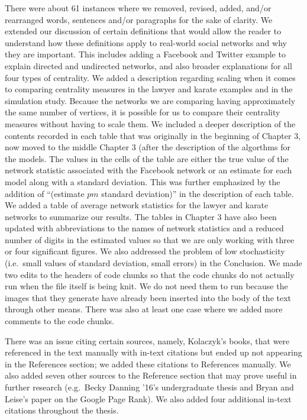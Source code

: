 \documentclass[12pt,twoside]{amherstthesis}
\begin{document}
  There were about 61 instances where we removed, revised, added, and/or
  rearranged words, sentences and/or paragraphs for the sake of clarity.
  We extended our discussion of certain definitions that would allow the
  reader to understand how these definitions apply to real-world social
  networks and why they are important. This includes adding a Facebook and
  Twitter example to explain directed and undirected networks, and also
  broader explanations for all four types of centrality. We added a
  description regarding scaling when it comes to comparing centrality
  measures in the lawyer and karate examples and in the simulation study.
  Because the networks we are comparing having approximately the same
  number of vertices, it is possible for us to compare their centrality
  measures without having to scale them. We included a deeper description
  of the contents recorded in each table that was originally in the
  beginning of Chapter 3, now moved to the middle Chapter 3 (after the
  description of the algorthms for the models. The values in the cells of
  the table are either the true value of the network statistic associated
  with the Facebook network or an estimate for each model along with a
  standard deviation. This was further emphasized by the addition of
  ``(estimate \(pm\) standard deviation)'' in the description of each
  table. We added a table of average network statistics for the lawyer and
  karate networks to summarize our results. The tables in Chapter 3 have
  also been updated with abbreviations to the names of network statistics
  and a reduced number of digits in the estimated values so that we are
  only working with three or four significant figures. We also addressed
  the problem of low stochasticity (i.e.~small values of standard
  deviation, small errors) in the Conclusion. We made two edits to the
  headers of code chunks so that the code chunks do not actually run when
  the file itself is being knit. We do not need them to run because the
  images that they generate have already been inserted into the body of
  the text through other means. There was also at least one case where we
  added more comments to the code chunks.
  
  There was an issue citing certain sources, namely, Kolaczyk's books,
  that were referenced in the text manually with in-text citations but
  ended up not appearing in the References section; we added these
  citations to References manually. We also added seven other sources to
  the Reference section that may prove useful in further research
  (e.g.~Becky Danning '16's undergraduate thesis and Bryan and Leise's
  paper on the Google Page Rank). We also added four additional in-text
  citations throughout the thesis.
  
\end{document}
